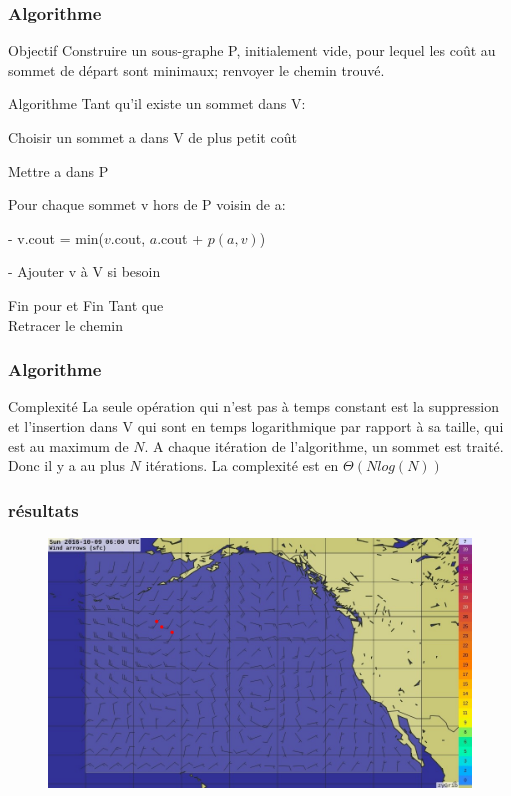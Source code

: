 \documentclass{beamer}
\begin{document}
\begin{frame}\frametitle{Algorithme}
	\begin{block}{Objectif}
	Construire un sous-graphe P, initialement vide, pour lequel les coût au sommet de départ sont minimaux; renvoyer le chemin 	trouvé.
	\end{block}
	\begin{exampleblock}{Algorithme}
	Tant qu'il existe un sommet dans V:
	\begin{description}
	\item Choisir un sommet a dans V de plus petit coût
	\item Mettre a dans P 
	\item Pour chaque sommet v hors de  P voisin de a:
	\item    -\;  v.cout = min($v$.cout, $a$.cout + $p(a,v)$)
	\item    -\;  Ajouter v à V si besoin
	\item Fin pour et Fin Tant que
	\\Retracer le chemin\\
	\end{description}
	\end{exampleblock}
\end{frame}


\begin{frame}\frametitle{Algorithme}
\begin{block}{Complexité}
La seule opération qui n'est pas à temps constant est la suppression et l'insertion dans V qui sont en temps logarithmique par rapport à sa taille, qui est au maximum de $N$. A chaque itération de l'algorithme, un sommet est traité. Donc il y a au plus $N$ itérations. La complexité est en $\Theta( Nlog(N))$
\end{block}
\end{frame}

\begin{frame}\frametitle{résultats}
\begin{figure}
\includegraphics[scale=0.3]{result11.jpg} 
\end{figure}
\end{frame}
\end{document}
